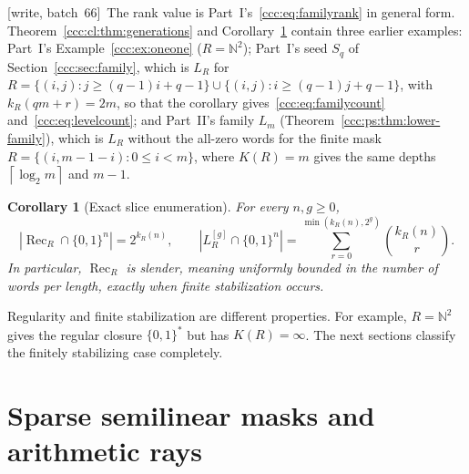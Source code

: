 \documentclass[11pt,letterpaper]{article}
\newtheorem{corollary}[theorem]{Corollary}
\theoremstyle{definition}
\theoremstyle{remark}
\newcommand{\N}{\mathbb N}
\newcommand{\rec}{\operatorname{Rec}}
\newcommand{\gen}[2]{#1^{[#2]}}
\newcommand{\clog}[1]{\left\lceil\log_2 #1\right\rceil}
\newcommand{\wsix}{\textup{[write, batch~66]}}
\begin{document}
\wsix\ The rank value is Part~I's~\eqref{ccc:eq:familyrank} in general form.
Theorem~\ref{ccc:cl:thm:generations} and Corollary~\ref{ccc:cl:cor:counts}
contain three earlier examples: Part~I's Example~\ref{ccc:ex:oneone}
($R=\N^2$); Part~I's seed $S_q$ of Section~\ref{ccc:sec:family}, which is $L_R$
for $R=\{(i,j):j\ge(q-1)i+q-1\}\cup\{(i,j):i\ge(q-1)j+q-1\}$, with $k_R(qm+r)=2m$,
so that the corollary gives~\eqref{ccc:eq:familycount}
and~\eqref{ccc:eq:levelcount}; and Part~II's family $L_m$
(Theorem~\ref{ccc:ps:thm:lower-family}), which is $L_R$ without the
all-zero words for the finite mask $R=\{(i,m-1-i):0\le i<m\}$, where
$K(R)=m$ gives the same depths $\clog m$ and $m-1$.

\begin{corollary}[Exact slice enumeration]\label{ccc:cl:cor:counts}
For every $n,g\ge0$,
\[
 |\rec_R\cap\{0,1\}^n|=2^{k_R(n)},\qquad
 |\gen{L_R}g\cap\{0,1\}^n|
 =\sum_{r=0}^{\min(k_R(n),2^g)}\binom{k_R(n)}r.
\]
In particular, $\rec_R$ is slender, meaning uniformly bounded in the number
of words per length, exactly when finite stabilization occurs.
\end{corollary}

Regularity and finite stabilization are different properties. For example,
$R=\N^2$ gives the regular closure $\{0,1\}^*$ but has $K(R)=\infty$.
The next sections classify the finitely stabilizing case completely.

\section{Sparse semilinear masks and arithmetic rays}\label{ccc:cl:sec:sparse}
\end{document}
